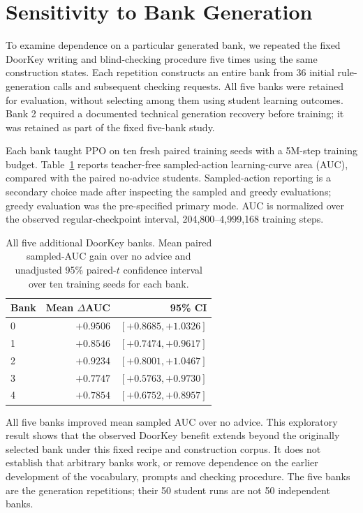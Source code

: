 \section{Sensitivity to Bank Generation}
\label{app:bank_regeneration}

To examine dependence on a particular generated bank, we repeated
the fixed DoorKey writing and blind-checking procedure five times
using the same construction states. Each repetition constructs an
entire bank from 36 initial rule-generation calls and subsequent
checking requests. All five banks were retained for evaluation,
without selecting among them using student learning outcomes.
Bank 2 required a documented technical generation recovery before
training; it was retained as part of the fixed five-bank study.

Each bank taught PPO on ten fresh paired training seeds with a
5M-step training budget. Table~\ref{tab:bank_regeneration} reports
teacher-free sampled-action learning-curve area (AUC), compared
with the paired no-advice students. Sampled-action reporting is
a secondary choice made after inspecting the sampled and greedy
evaluations; greedy evaluation was the pre-specified primary mode.
AUC is normalized over the observed regular-checkpoint interval,
204{,}800--4{,}999{,}168 training steps.

\begin{table}[ht]
\centering\small
\caption{All five additional DoorKey banks. Mean paired sampled-AUC
gain over no advice and unadjusted 95\% paired-$t$ confidence interval
over ten training seeds for each bank.}
\label{tab:bank_regeneration}
\begin{tabular}{@{}lrr@{}}
\toprule
Bank & Mean $\Delta$AUC & 95\% CI\\
\midrule
0 & $+0.9506$ & $[+0.8685,+1.0326]$\\
1 & $+0.8546$ & $[+0.7474,+0.9617]$\\
2 & $+0.9234$ & $[+0.8001,+1.0467]$\\
3 & $+0.7747$ & $[+0.5763,+0.9730]$\\
4 & $+0.7854$ & $[+0.6752,+0.8957]$\\
\bottomrule
\end{tabular}
\end{table}

All five banks improved mean sampled AUC over no advice. This
exploratory result shows that the observed DoorKey benefit extends
beyond the originally selected bank under this fixed recipe and
construction corpus. It does not establish that arbitrary banks
work, or remove dependence on the earlier development of the
vocabulary, prompts and checking procedure. The five banks are
the generation repetitions; their 50 student runs are not 50
independent banks.

